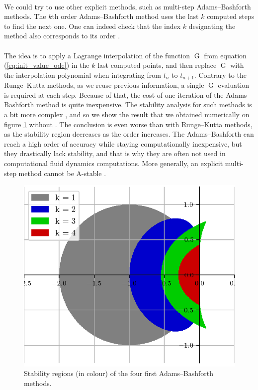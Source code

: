         \paragraph{}
        We could try to use other explicit methods, such as multi-step Adams--Bashforth methods.
        The $k$th order Adams--Bashforth method uses the last $k$ computed steps to find the next one.
        One can indeed check that the index $k$ designating the method also corresponds to its order \cite{HairerNorsettWanner1993}.

        \paragraph{}
        The idea is to apply a Lagrange interpolation of the function $\operatorname{G}$ from equation (\ref{eq:init_value_ode}) in the $k$ last computed points, and then replace $\operatorname{G}$ with the interpolation polynomial when integrating from $t_n$ to $t_{n+1}$.
        Contrary to the Runge--Kutta methods, as we reuse previous information, a single $\operatorname{G}$ evaluation is required at each step.
        Because of that, the cost of one iteration of the Adams--Bashforth method is quite inexpensive.
        The stability analysis for such methods is a bit more complex \cite{HairerNorsettWanner1993, HairerWanner1996}, and so we show the result that we obtained numerically on figure \ref{fig:ab_stab} without .
        The conclusion is even worse than with Runge--Kutta methods, as the stability region decreases as the order increases.
        The Adams--Bashforth can reach a high order of accuracy while staying computationally inexpensive, but they drastically lack stability, and that is why they are often not used in computational fluid dynamics computations.
        More generally, an explicit multi-step method cannot be A-stable \cite{Dahlquist1963}.

        \begin{figure}
          \centering
          \includegraphics{figures/ab_stab.png}
          \caption{Stability regions (in colour) of the four first Adams--Bashforth methods.}
          \label{fig:ab_stab}
        \end{figure}


